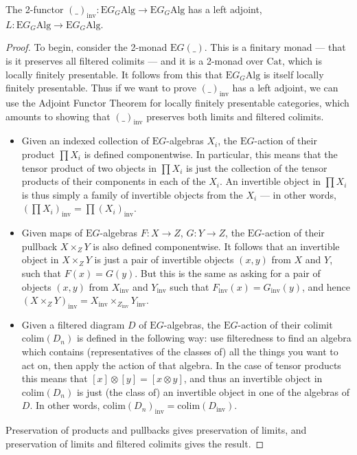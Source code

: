 \begin{prop} \label{invadj} The 2-functor $(\_)_{\mathrm{inv}}: \mathrm{E}G_G\mathrm{Alg} \to \mathrm{E}G_G\mathrm{Alg}$ has a left adjoint, $L: \mathrm{E}G_G\mathrm{Alg} \to \mathrm{E}G_G\mathrm{Alg}$.
\end{prop}
\begin{proof} To begin, consider the 2-monad $\mathrm{E}G(\_)$. This is a finitary monad --- that is it preserves all filtered colimits --- and it is a 2-monad over $\mathrm{Cat}$, which is locally finitely presentable. It follows from this that $\mathrm{E}G_G\mathrm{Alg}$ is itself locally finitely presentable. Thus if we want to prove $(\_)_{\mathrm{inv}}$ has a left adjoint, we can use the Adjoint Functor Theorem for locally finitely presentable categories, which amounts to showing that $(\_)_{\mathrm{inv}}$ preserves both limits and filtered colimits.
\begin{itemize}
\item Given an indexed collection of $\mathrm{E}G$-algebras $X_i$, the $\mathrm{E}G$-action of their product $\prod X_i$ is defined componentwise. In particular, this means that the tensor product of two objects in $\prod X_i$ is just the collection of the tensor products of their components in each of the $X_i$. An invertible object in $\prod X_i$ is thus simply a family of invertible objects from the $X_i$ --- in other words, $(\prod X_i)_{\mathrm{inv}} = \prod (X_i)_{\mathrm{inv}}$.
\item Given maps of $\mathrm{E}G$-algebras $F: X \to Z$, $G : Y \to Z$, the $\mathrm{E}G$-action of their pullback $X \times_Z Y$ is also defined componentwise. It follows that an invertible object in $X \times_Z Y$ is just a pair of invertible objects $(x, y)$ from $X$ and $Y$, such that $F(x) = G(y)$. But this is the same as asking for a pair of objects $(x, y)$ from $X_{\mathrm{inv}}$ and $Y_{\mathrm{inv}}$ such that $F_{\mathrm{inv}}(x) = G_{\mathrm{inv}}(y)$, and hence $(X \times_Z Y)_{\mathrm{inv}} = X_{\mathrm{inv}} \times_{Z_{\mathrm{inv}}} Y_{\mathrm{inv}}$.
\item Given a filtered diagram $D$ of $\mathrm{E}G$-algebras, the $\mathrm{E}G$-action of their colimit $\mathrm{colim}(D_n)$ is defined in the following way: use filteredness to find an algebra which contains (representatives of the classes of) all the things you want to act on, then apply the action of that algebra. In the case of tensor products this means that $[x]\otimes[y] = [x \otimes y]$, and thus an invertible object in $\mathrm{colim}(D_n)$ is just (the class of) an invertible object in one of the algebras of $D$. In other words, $\mathrm{colim}(D_n)_{\mathrm{inv}} = \mathrm{colim}(D_{\mathrm{inv}})$.
\end{itemize}
Preservation of products and pullbacks gives preservation of limits, and preservation of limits and filtered colimits gives the result.
\end{proof}

